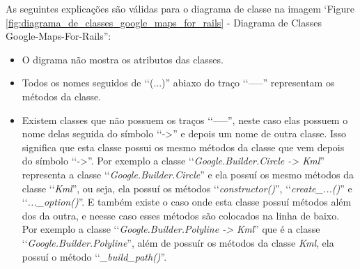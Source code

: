 As seguintes explicações são válidas para o diagrama de classe na imagem ‘Figure 
\ref{fig:diagrama_de_classes_google_maps_for_rails} - Diagrama de Classes Google-Maps-For-Rails'':

\begin{itemize}

 \item O digrama não mostra os atributos das classes. 
 
 \item Todos os nomes seguidos de ‘‘(...)'' abiaxo do traço ‘‘-----'' representam os métodos da classe.
 
 \item Existem classes que não possuem os traços ‘‘-----'', neste caso elas possuem o nome delas
 seguida do símbolo ‘‘->'' e depois um nome de outra classe. Isso significa que esta classe
 possui os mesmo métodos da classe que vem depois do símbolo ‘‘->''. Por exemplo a 
 classe ‘‘\emph{Google.Builder.Circle -> Kml}'' representa a classe ‘‘\emph{Google.Builder.Circle}'' 
 e ela possuí os mesmo métodos da classe ‘‘\emph{Kml}'', ou seja, ela possuí os métodos
 ‘‘\emph{constructor()}'', ‘‘\emph{create\_...()}'' e ‘‘\emph{...\_option()}''. E também existe o caso 
 onde esta classe possuí métodos além dos da outra, e neesse caso esses métodos são colocados na linha 
 de baixo. Por exemplo a classe ‘‘\emph{Google.Builder.Polyline -> Kml}'' que é a classe 
 ‘‘\emph{Google.Builder.Polyline}'', além de possuír os métodos da classe \emph{Kml}, ela 
 possuí o método ‘‘\emph{\_build\_path()}''.
 
\end{itemize}

